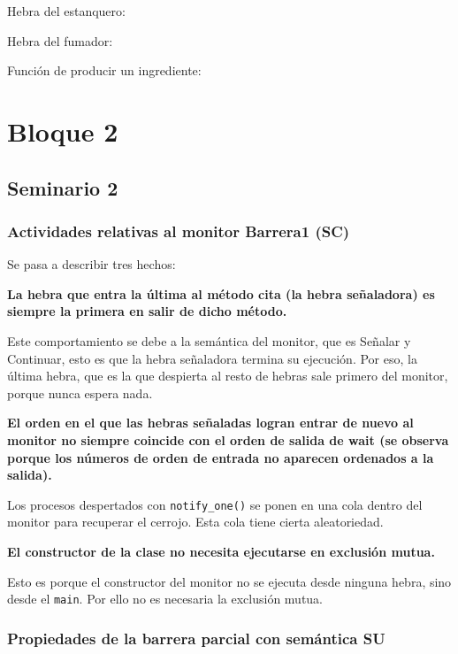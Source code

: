 \documentclass[12pt,a4paper]{article}
\def\code#1{\texttt{#1}}
\begin{document}
Hebra del estanquero:



Hebra del fumador:



Función de producir un ingrediente:



\section{Bloque 2}
\subsection{Seminario 2}
\subsubsection{Actividades relativas al monitor Barrera1 (SC)}

Se pasa a describir tres hechos:

\textbf{La hebra que entra la última al método cita (la hebra señaladora) es siempre la primera en salir de dicho método.}

Este comportamiento se debe a la semántica del monitor, que es Señalar y Continuar, esto es que la hebra señaladora termina su ejecución. Por eso, la última hebra, que es la que despierta al resto de hebras sale primero del monitor, porque nunca espera nada.

\textbf{El orden en el que las hebras señaladas logran entrar de nuevo
al monitor no siempre coincide con el orden de salida de wait
(se observa porque los números de orden de entrada no
aparecen ordenados a la salida).}

Los procesos despertados con \code{notify\_one()} se ponen en una cola dentro del monitor para recuperar el cerrojo. Esta cola tiene cierta aleatoriedad.

\textbf{El constructor de la clase no necesita ejecutarse en exclusión mutua.}

Esto es porque el constructor del monitor no se ejecuta desde ninguna hebra, sino desde el \code{main}. Por ello no es necesaria la exclusión mutua.

\subsubsection{Propiedades de la barrera parcial con semántica SU}
\end{document}
